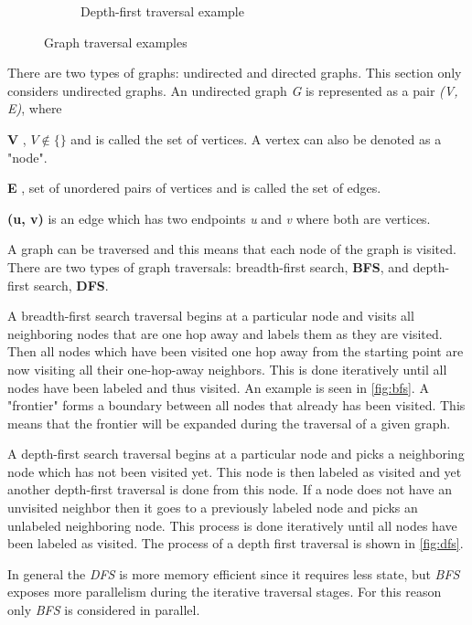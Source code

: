 \begin{figure}
\begin{subfigure}[b]{0.3\textwidth}
\begin{center}
{			}
		\end{center}
		\caption{Depth-first traversal example}
		\label{fig:dfs}
	\end{subfigure}
	\caption{Graph traversal examples}
\end{figure}
There are two types of graphs: undirected and directed graphs.
This section only considers undirected graphs.
An undirected graph \textit{G} is represented as a pair \textit{(V, E)}, where
\begin{itemizeSmall}
	\item[\textbf{V}], $V\notin \{\}$ and is called the set of vertices. A vertex can also be denoted as a "node".
	\item[\textbf{E}], set of unordered pairs of vertices and is called the set of edges.
	\item[\textbf{(u, v)}] is an edge which has two endpoints \textit{u} and \textit{v} where both are vertices.
\end{itemizeSmall}

A graph can be traversed and this means that each node of the graph is visited.
There are two types of graph traversals: breadth-first search, \textbf{BFS}, and depth-first search, \textbf{DFS}.

A breadth-first search traversal begins at a particular node and visits all neighboring nodes that are one hop away and labels them as they are visited. 
Then all nodes which have been visited one hop away from the starting point are now visiting all their one-hop-away neighbors. 
This is done iteratively until all nodes have been labeled and thus visited.
An example is seen in \autoref{fig:bfs}.
A "frontier" forms a boundary between all nodes that already has been visited.
This means that the frontier will be expanded during the traversal of a given graph.

A depth-first search traversal begins at a particular node and picks a neighboring node which has not been visited yet. 
This node is then labeled as visited and yet another depth-first traversal is done from this node. 
If a node does not have an unvisited neighbor then it goes to a previously labeled node and picks an unlabeled neighboring node. 
This process is done iteratively until all nodes have been labeled as visited.
The process of a depth first traversal is shown in \autoref{fig:dfs}.

In general the \textit{DFS} is more memory efficient since it requires less state, but \textit{BFS} exposes more parallelism during the iterative traversal stages.
For this reason only \textit{BFS} is considered in parallel.

